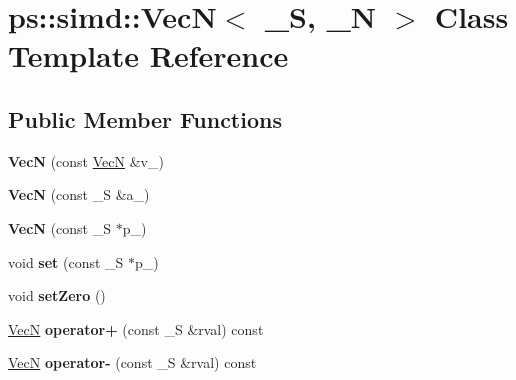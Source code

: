 \hypertarget{classps_1_1simd_1_1VecN}{}\section{ps\+:\+:simd\+:\+:Vec\+N$<$ \+\_\+\+S, \+\_\+\+N $>$ Class Template Reference}
\label{classps_1_1simd_1_1VecN}
\subsection*{Public Member Functions}
\begin{DoxyCompactItemize}
\item 
\hypertarget{classps_1_1simd_1_1VecN_a3e99f55340c0e7a0df4f46e54e0e4be4}{}{\bfseries Vec\+N} (const \hyperlink{classps_1_1simd_1_1VecN}{Vec\+N} \&v\+\_\+)\label{classps_1_1simd_1_1VecN_a3e99f55340c0e7a0df4f46e54e0e4be4}

\item 
\hypertarget{classps_1_1simd_1_1VecN_a8b884bf927cd89f065cdde8453625a2a}{}{\bfseries Vec\+N} (const \+\_\+\+S \&a\+\_\+)\label{classps_1_1simd_1_1VecN_a8b884bf927cd89f065cdde8453625a2a}

\item 
\hypertarget{classps_1_1simd_1_1VecN_aa5dbf5f04561463fe639c2ce9ce97a71}{}{\bfseries Vec\+N} (const \+\_\+\+S $\ast$p\+\_\+)\label{classps_1_1simd_1_1VecN_aa5dbf5f04561463fe639c2ce9ce97a71}

\item 
\hypertarget{classps_1_1simd_1_1VecN_a88e2292fa7073494b0d8cc7e0d4ccc80}{}void {\bfseries set} (const \+\_\+\+S $\ast$p\+\_\+)\label{classps_1_1simd_1_1VecN_a88e2292fa7073494b0d8cc7e0d4ccc80}

\item 
\hypertarget{classps_1_1simd_1_1VecN_a526738ed187e6c2d283c19a47aceb35c}{}void {\bfseries set\+Zero} ()\label{classps_1_1simd_1_1VecN_a526738ed187e6c2d283c19a47aceb35c}

\item 
\hypertarget{classps_1_1simd_1_1VecN_aec9194edb517586fec35c0fb71d63301}{}\hyperlink{classps_1_1simd_1_1VecN}{Vec\+N} {\bfseries operator+} (const \+\_\+\+S \&rval) const \label{classps_1_1simd_1_1VecN_aec9194edb517586fec35c0fb71d63301}

\item 
\hypertarget{classps_1_1simd_1_1VecN_a0f642a42226d32c99cdf6e49a2c2309e}{}\hyperlink{classps_1_1simd_1_1VecN}{Vec\+N} {\bfseries operator-\/} (const \+\_\+\+S \&rval) const \label{classps_1_1simd_1_1VecN_a0f642a42226d32c99cdf6e49a2c2309e}


\end{DoxyCompactItemize}
